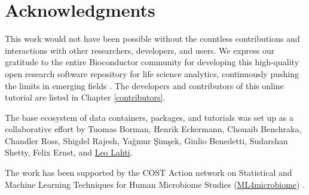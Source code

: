 \documentclass[
]{book}
\newenvironment{Shaded}{\begin{snugshade}}{\end{snugshade}}
\newcommand{\CommentTok}[1]{\textcolor[rgb]{0.56,0.35,0.01}{\textit{#1}}}
\newcommand{\DecValTok}[1]{\textcolor[rgb]{0.00,0.00,0.81}{#1}}
\newcommand{\FunctionTok}[1]{\textcolor[rgb]{0.00,0.00,0.00}{#1}}
\newcommand{\NormalTok}[1]{#1}
\newcommand{\OtherTok}[1]{\textcolor[rgb]{0.56,0.35,0.01}{#1}}
\newcommand{\SpecialCharTok}[1]{\textcolor[rgb]{0.00,0.00,0.00}{#1}}
\newcommand{\StringTok}[1]{\textcolor[rgb]{0.31,0.60,0.02}{#1}}
\begin{document}
\begin{Shaded}
\end{Shaded}

\hypertarget{acknowledgments}{%
\chapter{Acknowledgments}\label{acknowledgments}}

This work would not have been possible without the countless
contributions and interactions with other researchers, developers, and
users. We express our gratitude to the entire Bioconductor community
for developing this high-quality open research software repository for
life science analytics, continuously pushing the limits in emerging
fields \citep[\citet{Huber2015}]{Gentleman2004}. The developers and contributors
of this online tutorial are listed in Chapter \ref{contributors}.

The base ecosystem of data containers, packages, and tutorials was set
up as a collaborative effort by Tuomas Borman, Henrik Eckermann,
Chouaib Benchraka, Chandler Ross, Shigdel Rajesh, Yağmur Şimşek,
Giulio Benedetti, Sudarshan Shetty, Felix Ernst, and \href{http://www.iki.fi/Leo.Lahti}{Leo
Lahti}.

The work has been supported by the COST Action network on Statistical
and Machine Learning Techniques for Human Microbiome Studies
(\href{https://www.ml4microbiome.eu/}{ML4microbiome}) \citep{MorenoIndias2021}.
\end{document}
